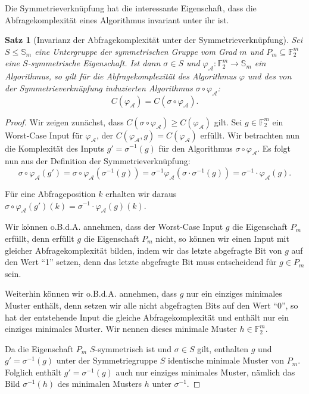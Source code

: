 \documentclass[10pt,a4paper, footheight=1mm, bibliography=totoc]{scrreprt}
\newtheorem{Satz}[definition]{Satz}
\theoremstyle{definition}
\begin{document}
Die Symmetrieverknüpfung hat die interessante Eigenschaft,
dass die Abfragekomplexität eines Algorithmus invariant unter
ihr ist.

\begin{Satz}[Invarianz der Abfragekomplexität unter der Symmetrieverknüpfung]
Sei $S\leq \mathbb{S}_m$ eine Untergruppe der symmetrischen Gruppe vom
Grad $m$ und $P_m \subseteq\mathbb{F}_2^m$ eine $S$-symmetrische
Eigenschaft. Ist dann $\sigma \in S$ und
$\varphi_\mathcal{A}:\mathbb{F}_2^m \to \mathbb{S}_m$ ein Algorithmus,
so gilt für die Abfragekomplexität des Algorithmus $\varphi$
und des von der Symmetrieverknüpfung induzierten Algorithmus
$\sigma \circ \varphi_\mathcal{A}$:
$$C(\varphi_\mathcal{A}) = C(\sigma \circ \varphi_\mathcal{A}).$$
\end{Satz}
\begin{proof}
Wir zeigen zunächst, dass 
$C(\sigma \circ \varphi_\mathcal{A}) \geq C(\varphi_\mathcal{A})$ gilt. 
Sei $g\in\mathbb{F}_2^m$ ein Worst-Case Input für $\varphi_\mathcal{A}$,
der $C(\varphi_\mathcal{A}, g) = C(\varphi_\mathcal{A})$ erfüllt.
Wir betrachten nun die Komplexität des Inputs $g' = \sigma^{-1}(g)$
für den Algorithmus $\sigma \circ \varphi_\mathcal{A}$.
Es folgt nun aus der Definition der Symmetrieverknüpfung:
\begin{equation}
\label{eq:Symmetrie}
\sigma \circ \varphi_\mathcal{A} (g')
= \sigma \circ \varphi_\mathcal{A} (\sigma^{-1}(g)) 
= \sigma^{-1} \varphi_\mathcal{A}(\sigma \cdot \sigma^{-1} (g))
= \sigma^{-1} \cdot \varphi_\mathcal{A}(g).
\end{equation}

Für eine Abfrageposition $k$ erhalten wir daraus 
$\sigma \circ \varphi_\mathcal{A}(g')(k) 
= \sigma^{-1} \cdot \varphi_\mathcal{A}(g)(k)$.

Wir können o.B.d.A. annehmen, dass der Worst-Case Input $g$ die
Eigenschaft $P_m$ erfüllt, denn erfüllt $g$ die Eigenschaft
$P_m$ nicht, so können wir einen Input  mit gleicher
Abfragekomplexität bilden, indem wir das letzte abgefragte
Bit von $g$ auf den Wert "`1"' setzen, denn das letzte
abgefragte Bit muss entscheidend für $g\in P_m$ sein.

Weiterhin können wir o.B.d.A. annehmen, dass $g$ nur 
ein einziges minimales Muster enthält, denn setzen wir
alle nicht abgefragten Bits auf den Wert "`0"', so hat
der entstehende Input die gleiche Abfragekomplexität
und enthält nur ein einziges minimales Muster.
Wir nennen dieses minimale Muster $h\in \mathbb{F}_2^m$.

Da die Eigenschaft $P_m$ $S$-symmetrisch ist und 
$\sigma\in S$ gilt, enthalten $g$ und $g'=\sigma^{-1}(g)$
unter der Symmetriegruppe $S$ identische minimale Muster von $P_m$.
Folglich enthält $g'=\sigma^{-1}(g)$ auch nur einziges minimales Muster,
nämlich das Bild $\sigma^{-1}(h)$ des minimalen Musters $h$ unter
$\sigma^{-1}$.


\end{proof}
\end{document}
